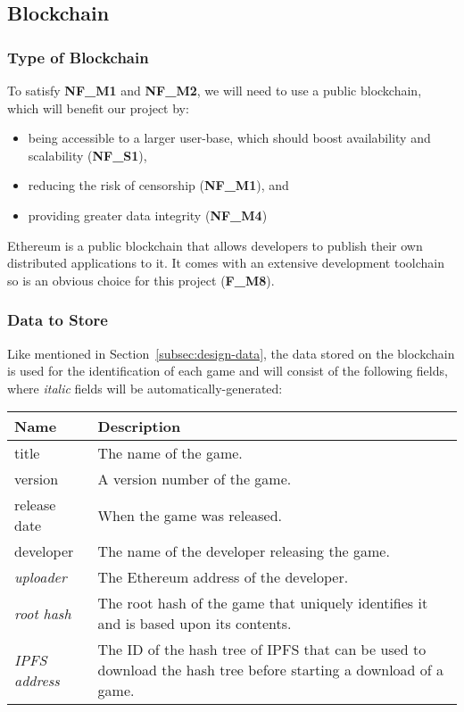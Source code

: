 
\subsection{Blockchain}

\subsubsection*{Type of Blockchain}

To satisfy \textbf{NF\_M1} and \textbf{NF\_M2}, we will need to use a public blockchain, which will benefit our project by:
\vspace{2mm}
\begin{itemize}
  \item being accessible to a larger user-base, which should boost availability and scalability (\textbf{NF\_S1}),
  \item reducing the risk of censorship (\textbf{NF\_M1}), and
  \item providing greater data integrity (\textbf{NF\_M4})
\end{itemize}

\vspace{2mm}\noindent Ethereum is a public blockchain that allows developers to publish their own distributed applications to it. It comes with an extensive development toolchain so is an obvious choice for this project (\textbf{F\_M8}).

\subsubsection*{Data to Store}
\label{subsubsec:eth-data}

Like mentioned in Section~\ref{subsec:design-data}, the data stored on the blockchain is used for the identification of each game and will consist of the following fields, where \textit{italic} fields will be automatically-generated:

\begin{longtable}{ p{} p{} }
  \toprule
  \textbf{Name} & \textbf{Description}
  \\\midrule\midrule
  title & The name of the game.\\
  version & A version number of the game.\\
  release date & When the game was released.\\
  developer & The name of the developer releasing the game.\\
  \textit{uploader} & The Ethereum address of the developer.\\
  \textit{root hash} & The root hash of the game that uniquely identifies it and is based upon its contents.\\
  \textit{IPFS address} & The ID of the hash tree of IPFS that can be used to download the hash tree before starting a download of a game.
  \\\bottomrule\bottomrule
\end{longtable}

